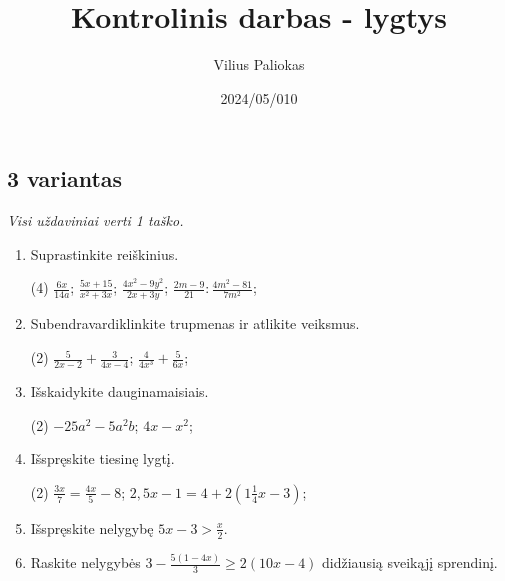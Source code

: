 \documentclass[a4paper]{article}
\title{Kontrolinis darbas - lygtys}
\author{Vilius Paliokas}
\date{2024/05/010}
\begin{document}
\thispagestyle{fancy}

\titlespacing*{\subsection}{0pt}{.75ex}{0.75ex}

\subsection*{3 variantas}

\textit{Visi uždaviniai verti 1 taško.}

\begin{enumerate}
      \item Suprastinkite reiškinius.
            \begin{tasks}[item-format={\normalfont}, after-item-skip=2mm](4)
                  \task $\frac{6x}{14a}$;
                  \task $\frac{5x+15}{x^2+3x}$;
                  \task $\frac{4x^2-9y^2}{2x+3y}$;
                  \task $\frac{2m-9}{21}:\frac{4m^2-81}{7m^2}$;
            \end{tasks}

      \item Subendravardiklinkite trupmenas ir atlikite veiksmus.
            \begin{tasks}[item-format={\normalfont}, after-item-skip=2mm](2)
                  \task $\frac{5}{2x-2}+\frac{3}{4x-4}$;
                  \task $\frac{4}{4x^3}+\frac{5}{6x}$;
            \end{tasks}

      \item Išskaidykite dauginamaisiais.
            \begin{tasks}[item-format={\normalfont}, after-item-skip=2mm](2)
                  \task $-25a^2-5a^2b$;
                  \task $4x-x^2$;
            \end{tasks}

      \item Išspręskite tiesinę lygtį.
            \begin{tasks}[item-format={\normalfont}, after-item-skip=2mm](2)
                  \task $\frac{3x}{7}=\frac{4x}{5}-8$;
                  \task $2,5x-1=4+2(1\frac{1}{4}x-3)$;
            \end{tasks}

      \item Išspręskite nelygybę $5x-3>\frac{x}{2}$.
      \item Raskite nelygybės $3-\frac{5(1-4x)}{3}\geq2(10x-4)$ didžiausią sveikąjį sprendinį.
\end{enumerate}
\end{document}
